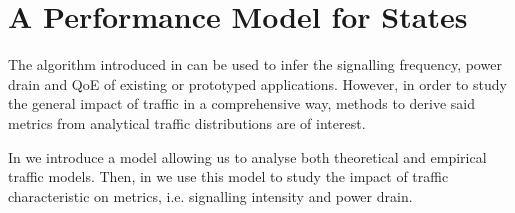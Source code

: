 \section{A Performance Model for   States}\label{sec:network:performance_model}
The algorithm introduced in  can be used to infer the signalling frequency, power drain and \gls{QoE} of existing or prototyped applications.
However, in order to study the general impact of traffic in a comprehensive way, methods to derive said metrics from analytical traffic distributions are of interest.

In  we introduce a model allowing us to 
analyse both theoretical and empirical traffic models.
Then, in  we use this model to study the impact of traffic characteristic on metrics, i.e. signalling intensity and power drain.



